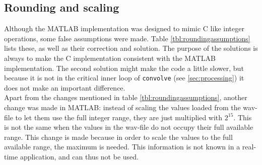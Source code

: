 \documentclass[a4paper]{article}
\begin{document}
\subsection{Rounding and scaling}
Although the MATLAB implementation was designed to mimic C like integer operations, some false assumptions were made. Table \ref{tbl:roundingassumptions} lists these, as well as their correction and solution. The purpose of the solutions is always to make the C implementation consistent with the MATLAB implementation. The second solution might make the code a little slower, but because it is not in the critical inner loop of \texttt{convolve} (see \ref{sec:processing}) it does not make an important difference.\\

Apart from the changes mentioned in table \ref{tbl:roundingassumptions}, another change was made in MATLAB: instead of scaling the values loaded from the wav-file to let them use the full integer range, they are just multiplied with $2^15$. This is not the same when the values in the wav-file do not occupy their full available range. This change is made because in order to scale the values to the full available range, the maximum is needed. This information is not known in a real-time application, and can thus not be used.
\begin{table}[htb]
\centering
{}
\caption{False assumptions about rounding mechanisms, with their corrections and solutions}
\label{tbl:roundingassumptions}
\end{table}
\end{document}
